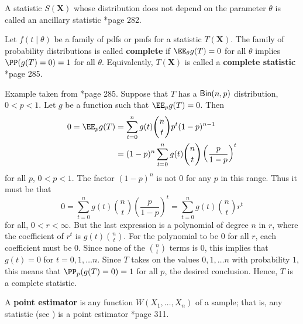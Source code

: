 \begin{defe} \label{defe: ancillary_statistic}
    A statistic $S(\bm{X})$ whose distribution does not depend on the parameter $\theta$ is called an ancillary statistic \cite{CasellaGeorge2001SI}*{page 282}.
\end{defe}

\begin{defe} \label{defe: complete_statistic}
    Let $f(t \mid \theta)$ be a family of pdfs or pmfs for a statistic $T(\bm{X})$. The family of probability distributions is called {\bf complete} if $\EE_{\theta} g(T) = 0$ for all $\theta$ implies $\PP (g(T) = 0) = 1$ for all $\theta$. Equivalently, $T(\bm{X})$ is called a {\bf complete statistic} \cite{CasellaGeorge2001SI}*{page 285}.
\end{defe}

\begin{exam} \label{exam: bin_comp_stat}
    Example taken from \cite{CasellaGeorge2001SI}*{page 285}. Suppose that $T$ has a ${\sf Bin} (n,p)$ distribution, $0<p<1$. Let $g$ be a function such that $\EE_{p} g(T) = 0$. Then
    \begin{align*}
        0 = \EE_{p} g(T) & = \sum_{t=0}^{n} g(t) \binom{n}{t} p^{t} (1-p)^{n-1}                        \\
                         & = (1-p)^n \sum_{t=0}^{n} g(t) \binom{n}{t} \left( \frac{p}{1-p} \right)^{t}
    \end{align*}
    for all $p$, $0<p<1$. The factor $(1-p)^n$ is not 0 for any $p$ in this range. Thus it must be that
    \begin{equation*}
        0 = \sum_{t=0}^{n} g(t) \binom{n}{t} \left( \frac{p}{1-p} \right)^{t} = \sum_{t=0}^{n} g(t) \binom{n}{t} r^t
    \end{equation*}
    for all, $0 < r < \infty$. But the last expression is a polynomial of degree $n$ in $r$, where the coefficient of $r^t$ is $g(t) \binom{n}{t}$. For the polynomial to be $0$ for all $r$, each coefficient must be $0$. Since none of the $\binom{n}{t}$ terms is $0$, this implies that $g(t) = 0$ for $t=0,1,\ldots n$. Since $T$ takes on the values $0,1,\ldots n$ with probability $1$, this means that $\PP_p (g(T) = 0) = 1$ for all $p$, the desired conclusion. Hence, $T$ is a complete statistic.
\end{exam}

\begin{defe} \label{defe: point_estimator}
    A {\bf point estimator} is any function $W(X_1 , \ldots , X_n)$ of a sample; that is, any statistic (see ) is a point estimator \cite{CasellaGeorge2001SI}*{page 311}.
\end{defe}

